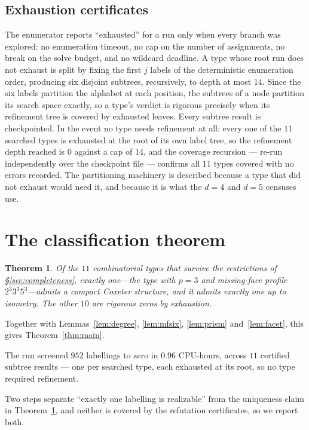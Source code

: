 \documentclass[11pt,reqno]{amsart}
\theoremstyle{plain}
\newtheorem{theorem}{Theorem}[section]
\theoremstyle{definition}
\newcommand{\NumRequired}{11}
\newcommand{\NumRequiredLess}{10}
\newcommand{\NumSubtrees}{11}
\newcommand{\NumAssignments}{952}
\newcommand{\CPUHours}{0.96}
\newcommand{\RealizingP}{3}
\newcommand{\RealizingProfile}{2^{3}3^{3}5^{3}}
\newcommand{\MaxDepth}{0}
\begin{document}
\subsection{Exhaustion certificates}
\label{sec:exhaust}
The enumerator reports ``exhausted'' for a run only when every
branch was explored: no enumeration timeout, no cap on the number of
assignments, no break on the solve budget, and no wildcard deadline. A type
whose root run does not exhaust is split by fixing the first $j$ labels of the
deterministic enumeration order, producing six disjoint subtrees, recursively,
to depth at most $14$. Since the six labels partition the alphabet at each
position, the subtrees of a node partition its search space exactly, so a type's
verdict is rigorous precisely when its refinement tree is covered by exhausted
leaves. Every subtree result is checkpointed. In the event no type needs
refinement at all: every one of the $\NumRequired$ searched types is exhausted at
the root of its own label tree, so the refinement depth reached is $\MaxDepth$
against a cap of $14$, and the coverage recursion --- re-run independently over the
checkpoint file --- confirms all $\NumRequired$ types covered with no errors
recorded. The partitioning machinery is described because a type that did not
exhaust would need it, and because it is what the $d=4$ and $d=5$ censuses use.

\section{The classification theorem}
\label{sec:polytope}

\begin{theorem}
\label{thm:search}
Of the $\NumRequired$ combinatorial types that survive the restrictions of
\S\ref{sec:completeness}, exactly one---the type with $p=\RealizingP$ and
missing-face profile $\RealizingProfile$---admits a compact Coxeter structure, and
it admits exactly one up to isometry. The other $\NumRequiredLess$ are rigorous
zeros by exhaustion.
\end{theorem}

Together with Lemmas~\ref{lem:degree}, \ref{lem:mfsix}, \ref{lem:prism}
and~\ref{lem:facet}, this
gives Theorem~\ref{thm:main}.

The run screened $\NumAssignments$ labellings to
zero in $\CPUHours$ CPU-hours, across $\NumSubtrees$ certified subtree results ---
one per searched type, each exhausted at its root, so no type required refinement.

Two steps separate ``exactly one labelling is realizable'' from the uniqueness
claim in Theorem~\ref{thm:search}, and neither is covered by the refutation
certificates, so we report both.
\end{document}
